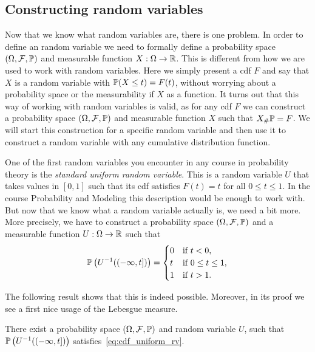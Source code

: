 \subsection{Constructing random variables}

Now that we know what random variables are, there is one problem. In order to define an random variable we need to formally define a probability space $(\Omega, \mathcal F, \mathbb P)$ and measurable function $X: \Omega \to \mathbb R$. This is different from how we are used to work with random variables. Here we simply present a cdf $F$ and say that $X$ is a random variable with $\mathbb P(X \le t) = F(t)$, without worrying about a probability space or the measurability if $X$ as a function. It turns out that this way of working with random variables is valid, as for any cdf $F$ we can construct a probability space $(\Omega, \mathcal F, \mathbb P)$ and measurable function $X$ such that $X_\# \mathbb P = F$. We will start this construction for a specific random variable and then use it to construct a random variable with any cumulative distribution function.

One of the first random variables you encounter in any course in probability theory is the \emph{standard uniform random variable}. This is a random variable $U$ that takes values in $[0,1]$ such that its cdf satisfies $F(t) = t$ for all $0\le t \le 1$. In the course Probability and Modeling this description would be enough to work with. But now that we know what a random variable actually is, we need a bit more. More precisely, we have to construct a probability space $(\Omega,\mathcal F, \mathbb P)$ and a measurable function $U : \Omega \to \mathbb R$ such that 
\begin{equation}\label{eq:cdf_uniform_rv}
	\mathbb P\left(U^{-1}((-\infty,t])\right) = \begin{cases}
		0 &\text{if } t < 0,\\
		t &\text{if } 0 \le t\le 1,\\
		1 &\text{if } t > 1.
	\end{cases}
\end{equation}

The following result shows that this is indeed possible. Moreover, in its proof we see a first nice usage of the Lebesgue measure.

\begin{proposition}\label{prop:uniform_random_variable}
There exist a probability space $(\Omega,\mathcal F, \mathbb P)$ and random variable $U$, such that $\mathbb P\left(U^{-1}((-\infty,t])\right)$ satisfies~\eqref{eq:cdf_uniform_rv}.
\end{proposition}


